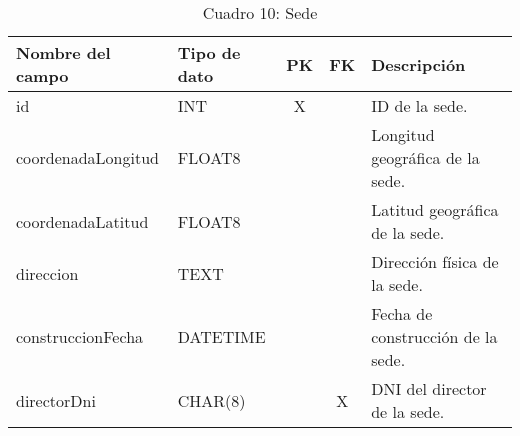 \begin{table}[H]
	\centering
	\begin{tabular}{|l|l|c|c|l|}
		\hline
		\textbf{Nombre del campo} & \textbf{Tipo de dato} & \textbf{PK} & \textbf{FK} & \textbf{Descripción}              \\
		\hline
		id                        & INT                   & X           &             & ID de la sede.                    \\
		\hline
		coordenadaLongitud        & FLOAT8                &             &             & Longitud geográfica de la sede.   \\
		\hline
		coordenadaLatitud         & FLOAT8                &             &             & Latitud geográfica de la sede.    \\
		\hline
		direccion                 & TEXT                  &             &             & Dirección física de la sede.      \\
		\hline
		construccionFecha         & DATETIME              &             &             & Fecha de construcción de la sede. \\
		\hline
		directorDni               & CHAR(8)               &             & X           & DNI del director de la sede.      \\
		\hline
	\end{tabular}
	\caption{Cuadro 10: Sede}
\end{table}